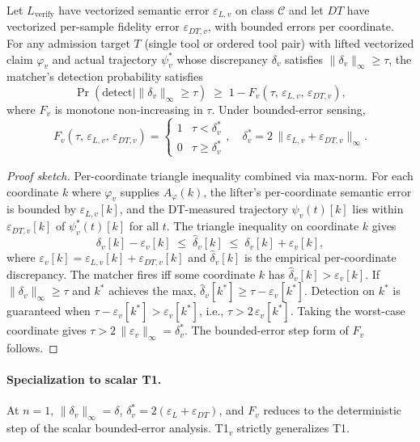 \begin{theorem}
\label{thm:t1v}
Let $L_{\text{verify}}$ have vectorized semantic error
$\varepsilon_{L,v}$ on class $\mathcal{C}$ and let $\mathit{DT}$ have
vectorized per-sample fidelity error $\varepsilon_{DT,v}$, with
bounded errors per coordinate. For any admission target $T$ (single
tool or ordered tool pair) with lifted vectorized claim $\varphi_v$
and actual trajectory $\psi_v^{*}$ whose discrepancy $\delta_v$
satisfies $\|\delta_v\|_\infty \geq \tau$, the matcher's
detection probability satisfies
\[
\Pr(\text{detect} \mid \|\delta_v\|_\infty \geq \tau)
   \;\geq\;
1 - F_v(\tau,\,\varepsilon_{L,v},\,\varepsilon_{DT,v}),
\]
where $F_v$ is monotone non-increasing in $\tau$. Under bounded-error
sensing,
\[
F_v(\tau,\,\varepsilon_{L,v},\,\varepsilon_{DT,v}) =
\begin{cases}
1 & \tau < \delta^{*}_{v} \\
0 & \tau \geq \delta^{*}_{v}
\end{cases},
\quad
\delta^{*}_{v} = 2\,\|\varepsilon_{L,v} + \varepsilon_{DT,v}\|_\infty.
\]
\end{theorem}

\begin{proof}[Proof sketch]
Per-coordinate triangle inequality combined via max-norm. For each
coordinate $k$ where $\varphi_v$ supplies $A_\varphi(k)$, the lifter's
per-coordinate semantic error is bounded by $\varepsilon_{L,v}[k]$,
and the DT-measured trajectory $\psi_v(t)[k]$ lies within
$\varepsilon_{DT,v}[k]$ of $\psi_v^{*}(t)[k]$ for all $t$.
The triangle inequality on coordinate $k$ gives
\[
\delta_v[k] - \varepsilon_v[k] \;\leq\; \hat\delta_v[k] \;\leq\;
\delta_v[k] + \varepsilon_v[k],
\]
where $\varepsilon_v[k] = \varepsilon_{L,v}[k] + \varepsilon_{DT,v}[k]$
and $\hat\delta_v[k]$ is the empirical per-coordinate discrepancy. The
matcher fires iff some coordinate $k$ has $\hat\delta_v[k] >
\varepsilon_v[k]$. If $\|\delta_v\|_\infty \geq \tau$ and
$k^{*}$ achieves the max, $\hat\delta_v[k^{*}] \geq \tau -
\varepsilon_v[k^{*}]$. Detection on $k^{*}$ is guaranteed when
$\tau - \varepsilon_v[k^{*}] > \varepsilon_v[k^{*}]$, i.e., $\tau >
2\,\varepsilon_v[k^{*}]$. Taking the worst-case coordinate gives
$\tau > 2\,\|\varepsilon_v\|_\infty = \delta^{*}_v$. The bounded-error
step form of $F_v$ follows.
\end{proof}

\paragraph{Specialization to scalar T1.}
At $n=1$, $\|\delta_v\|_\infty = \delta$, $\delta^{*}_v = 2(\varepsilon_L
+ \varepsilon_{DT})$, and $F_v$ reduces to the deterministic step of
the scalar bounded-error analysis. T1${}_v$ strictly generalizes T1.

